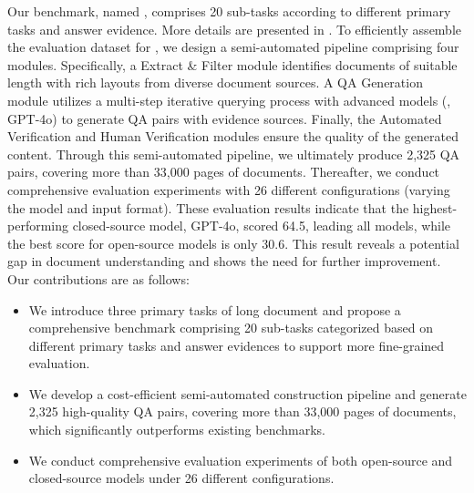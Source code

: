 Our benchmark, named \textbf{\benchName}, comprises 20 sub-tasks according to different primary tasks and answer evidence. More details are presented in . To efficiently assemble the evaluation dataset for \benchName, we design a semi-automated pipeline comprising four modules. Specifically, a Extract \& Filter module identifies documents of suitable length with rich layouts from diverse document sources. A QA Generation module utilizes a multi-step iterative querying process with advanced models (\eg, GPT-4o) to generate QA pairs with evidence sources. Finally, the Automated Verification and Human Verification modules ensure the quality of the generated content. Through this semi-automated pipeline, we ultimately produce 2,325 QA pairs, covering more than 33,000 pages of documents. Thereafter, we conduct comprehensive evaluation experiments with 26 different configurations (varying the model and input format). These evaluation results indicate that the highest-performing closed-source model, GPT-4o, scored 64.5, leading all models, while the best score for open-source models is only 30.6. This result reveals a potential gap in document understanding and shows the need for further improvement. Our contributions are as follows:
\begin{itemize}[leftmargin=*]
    \item We introduce three primary tasks of long document and propose a comprehensive benchmark comprising 20 sub-tasks categorized based on different primary tasks and answer evidences to support more fine-grained evaluation.
    \item We develop a cost-efficient semi-automated construction pipeline and generate 2,325 high-quality QA pairs, covering more than 33,000 pages of documents, which significantly outperforms existing benchmarks.
    \item We conduct comprehensive evaluation experiments of both open-source and closed-source models under 26 different configurations.
\end{itemize}